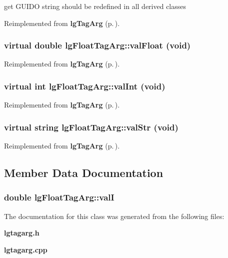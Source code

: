 get GUIDO string should be redefined in all derived classes 

Reimplemented from {\bf lg\-Tag\-Arg} {\rm (p.\,\pageref{classlgTagArg_a0})}.
\subsubsection{\setlength{\rightskip}{0pt plus 5cm}virtual double lg\-Float\-Tag\-Arg::val\-Float (void)\hspace{0.3cm}{\tt  [inline, virtual]}}\label{classlgFloatTagArg_a2}




Reimplemented from {\bf lg\-Tag\-Arg} {\rm (p.\,\pageref{classlgTagArg_a5})}.
\subsubsection{\setlength{\rightskip}{0pt plus 5cm}virtual int lg\-Float\-Tag\-Arg::val\-Int (void)\hspace{0.3cm}{\tt  [inline, virtual]}}\label{classlgFloatTagArg_a4}




Reimplemented from {\bf lg\-Tag\-Arg} {\rm (p.\,\pageref{classlgTagArg_a4})}.
\subsubsection{\setlength{\rightskip}{0pt plus 5cm}virtual string lg\-Float\-Tag\-Arg::val\-Str (void)\hspace{0.3cm}{\tt  [inline, virtual]}}\label{classlgFloatTagArg_a3}




Reimplemented from {\bf lg\-Tag\-Arg} {\rm (p.\,\pageref{classlgTagArg_a3})}.

\subsection{Member Data Documentation}
\subsubsection{\setlength{\rightskip}{0pt plus 5cm}double {\bf lg\-Float\-Tag\-Arg::val\-I}\hspace{0.3cm}{\tt  [private]}}\label{classlgFloatTagArg_r0}




The documentation for this class was generated from the following files:\begin{CompactItemize}
\item 
{\bf lgtagarg.h}\item 
{\bf lgtagarg.cpp}\end{CompactItemize}
